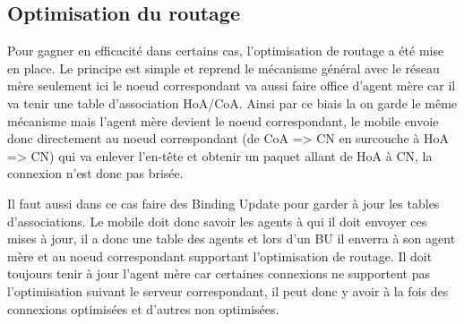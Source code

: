 \subsection{Optimisation du routage}

Pour gagner en efficacité dans certains cas, l’optimisation de routage a été mise en place. Le principe est simple et reprend le mécanisme général avec le réseau mère seulement ici le noeud correspondant va aussi faire office d’agent mère car il va tenir une table d’association HoA/CoA. Ainsi par ce biais la on garde le même mécanisme mais l’agent mère devient le noeud correspondant, le mobile envoie donc directement au noeud correspondant (de CoA => CN en surcouche à HoA => CN) qui va enlever l’en-tête et obtenir un paquet allant de HoA à CN, la connexion n’est donc pas brisée.


Il faut aussi dans ce cas faire des Binding Update pour garder à jour les tables d’associations. Le mobile doit donc savoir les agents à qui il doit envoyer ces mises à jour, il a donc une table des agents et lors d’un BU il enverra à son agent mère et au noeud correspondant supportant l’optimisation de routage. Il doit toujours tenir à jour l’agent mère car certaines connexions ne supportent pas l’optimisation suivant le serveur correspondant, il peut donc y avoir à la fois des connexions optimisées et d’autres non optimisées.

